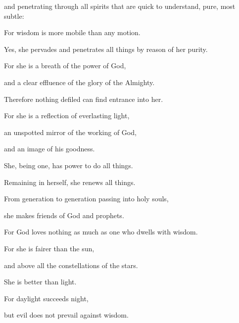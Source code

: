 {\par }{\QB and penetrating through all spirits that are quick to understand, pure, most subtle:
\par }{\Q {}For wisdom is more mobile than any motion.
\par }{\QB Yes, she pervades and penetrates all things by reason of her purity.
\par }{\Q {}For she is a breath of the power of God,
\par }{\QB and a clear effluence of the glory of the Almighty.
\par }{\Q Therefore nothing defiled can find entrance into her.
\par }{\Q {}For she is a reflection of everlasting light,
\par }{\QB an unspotted mirror of the working of God,
\par }{\QB and an image of his goodness.
\par }{\Q {}She, being one, has power to do all things.
\par }{\QB Remaining in herself, she renews all things.
\par }{\Q From generation to generation passing into holy souls,
\par }{\QB she makes friends of God and prophets.
\par }{\QB {}For God loves nothing as much as one who dwells with wisdom.
\par }{\Q {}For she is fairer than the sun,
\par }{\QB and above all the constellations of the stars.
\par }{\QB She is better than light.
\par }{\Q {}For daylight succeeds night,
\par }{\QB but evil does not prevail against wisdom.

}
